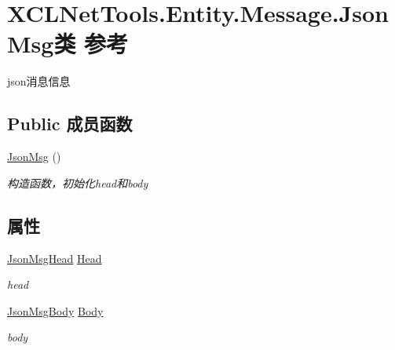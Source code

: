 \hypertarget{class_x_c_l_net_tools_1_1_entity_1_1_message_1_1_json_msg}{}\section{X\+C\+L\+Net\+Tools.\+Entity.\+Message.\+Json\+Msg类 参考}
\label{class_x_c_l_net_tools_1_1_entity_1_1_message_1_1_json_msg}


json消息信息  


\subsection*{Public 成员函数}
\begin{DoxyCompactItemize}
\item 
\hyperlink{class_x_c_l_net_tools_1_1_entity_1_1_message_1_1_json_msg_ae2ac35179c067375a48b581b155a8763}{Json\+Msg} ()
\begin{DoxyCompactList}\small\item\em 构造函数，初始化head和body \end{DoxyCompactList}\end{DoxyCompactItemize}
\subsection*{属性}
\begin{DoxyCompactItemize}
\item 
\hyperlink{class_x_c_l_net_tools_1_1_entity_1_1_message_1_1_json_msg_head}{Json\+Msg\+Head} \hyperlink{class_x_c_l_net_tools_1_1_entity_1_1_message_1_1_json_msg_a563af2b66f8c22c04ff557cfe34f2479}{Head}
\begin{DoxyCompactList}\small\item\em head \end{DoxyCompactList}\item 
\hyperlink{class_x_c_l_net_tools_1_1_entity_1_1_message_1_1_json_msg_body}{Json\+Msg\+Body} \hyperlink{class_x_c_l_net_tools_1_1_entity_1_1_message_1_1_json_msg_acf586e3003ee68f1b03a77a75b519ad3}{Body}
\begin{DoxyCompactList}\small\item\em body \end{DoxyCompactList}\end{DoxyCompactItemize}


